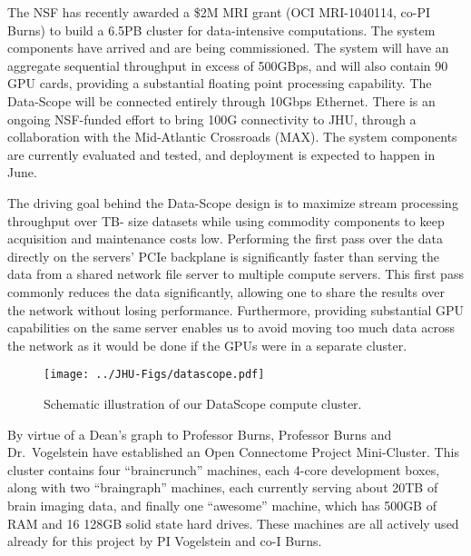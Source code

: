 \documentclass[11pt]{nih}
\begin{document}

The NSF has recently awarded a \$2M MRI grant (OCI MRI-1040114, co-PI Burns) to build a 6.5PB cluster for data-intensive computations. The system components have arrived and are being commissioned. The system will have an aggregate sequential throughput in excess of 500GBps, and will also contain 90 GPU cards, providing a substantial floating point processing capability. The Data-Scope will be connected entirely through 10Gbps Ethernet. There is an ongoing NSF-funded effort to bring 100G connectivity to JHU, through a collaboration with the Mid-Atlantic Crossroads (MAX). The system components are currently evaluated and tested, and deployment is expected to happen in June.

The driving goal behind the Data-Scope design is to maximize stream processing throughput over TB- size datasets while using commodity components to keep acquisition and maintenance costs low. Performing the first pass over the data directly on the servers' PCIe backplane is significantly faster than serving the data from a shared network file server to multiple compute servers. This first pass commonly reduces the data significantly, allowing one to share the results over the network without losing performance. Furthermore, providing substantial GPU capabilities on the same server enables us to avoid moving too much data across the network as it would be done if the GPUs were in a separate cluster.

\begin{figure}[h!]
\centering
\texttt{[image: ../JHU-Figs/datascope.pdf]}
\caption[Datascope.]{Schematic illustration of our DataScope compute cluster.}
\label{fig:orgchat}
\end{figure}


% 
By virtue of a Dean's graph to Professor Burns, Professor Burns and Dr.~Vogelstein have established an Open Connectome Project Mini-Cluster.  This cluster contains four ``braincrunch'' machines, each 4-core development boxes, along with two ``braingraph'' machines, each currently serving about 20TB of brain imaging data, and finally one ``awesome'' machine, which has 500GB of RAM and 16 128GB solid state hard drives.  These machines are all actively used already for this project by PI Vogelstein and co-I Burns.
\end{document}
